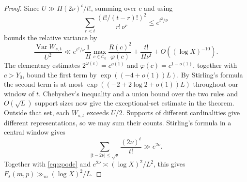 \documentclass[a4paper,11pt]{article}
\begin{document}
\begin{proof}
Since $U\gg H(2\nu)^t/t!$, summing over $c$ and using
\[
 \sum_{r<t}\frac{(t!/(t-r)!)^2}{r!\,\nu^r}\le e^{t^2/\nu}
\]
bounds the relative variance by
\[
 \frac{\operatorname{Var}W_{s,t}}{U^2}\ll
  e^{t^2/\nu}\frac{1}{H}
   \max_{c\in\mathcal C_0}\frac{R(c)^2}{\varphi(c)}
  +\frac{t!}{H\nu^t}+O((\log X)^{-10}).
\]
The elementary estimates $2^{\omega(c)}=c^{o(1)}$ and
$\varphi(c)=c^{1-o(1)}$, together with $c>Y_0$, bound the first
term by $\exp((-4+o(1))L)$. By Stirling's formula the second term
is at most $\exp((-2+2\log2+o(1))L)$ throughout our window of $t$.
Chebyshev's inequality and a union bound over the two rules and
$O(\sqrt L)$ support sizes now give the exceptional-set estimate in
the theorem. Outside that set, each $W_{s,t}$ exceeds $U/2$. Supports
of different cardinalities give different representations, so we
may sum their counts. Stirling's formula in a central window gives
\[
 \sum_{|t-2\nu|\le\sqrt\nu}\frac{(2\nu)^t}{t!}\gg e^{2\nu}.
\]
Together with \eqref{eq:goodc} and $e^{2\nu}\asymp
(\log X)^2/L^2$, this gives $F_s(m,p)\gg_m(\log X)^2/L$.
\end{proof}
\end{document}

